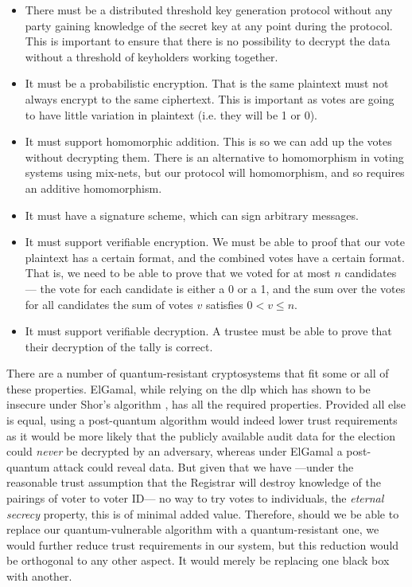\begin{itemize}
    \item There must be a distributed threshold key generation protocol without any party gaining knowledge of the secret key at any point during the protocol. This is important to ensure that there is no possibility to decrypt the data without a threshold of keyholders working together.
    \item It must be a probabilistic encryption. That is the same plaintext must not always encrypt to the same ciphertext. This is important as votes are going to have little variation in plaintext (i.e. they will be 1 or 0).
    \item It must support homomorphic addition. This is so we can add up the votes without decrypting them. There is an alternative to homomorphism in voting systems using mix-nets, but our protocol will homomorphism, and so requires an additive homomorphism.
    \item It must have a signature scheme, which can sign arbitrary messages.
    \item It must support verifiable encryption. We must be able to proof that our vote plaintext has a certain format, and the combined votes have a certain format. That is, we need to be able to prove that we voted for at most $n$ candidates --- the vote for each candidate is either a 0 or a 1, and the sum over the votes for all candidates the sum of votes $v$ satisfies $0 < v \leq n$.
    \item It must support verifiable decryption. A trustee must be able to prove that their decryption of the tally is correct.
\end{itemize}

There are a number of quantum-resistant cryptosystems \cite{regevLatticesLearningErrors2009,gentryFullyHomomorphicEncryption2009,hoffsteinNTRURingbasedPublic1998,feoQuantumresistantCryptosystemsSupersingular2011} that fit some or all of these properties. ElGamal, while relying on the \gls{dlp} which has shown to be insecure under Shor's algorithm \cite{shorAlgorithmsQuantumComputation1994}, has all the required properties. Provided all else is equal, using a post-quantum algorithm would indeed lower trust requirements as it would be more likely that the publicly available audit data for the election could \emph{never} be decrypted by an adversary, whereas under ElGamal a post-quantum attack could reveal data. But given that we have ---under the reasonable trust assumption that the Registrar will destroy knowledge of the pairings of voter to voter ID--- no way to try votes to individuals, the \emph{eternal secrecy} property, this is of minimal added value. Therefore, should we be able to replace our quantum-vulnerable algorithm with a quantum-resistant one, we would further reduce trust requirements in our system, but this reduction would be orthogonal to any other aspect. It would merely be replacing one black box with another.

